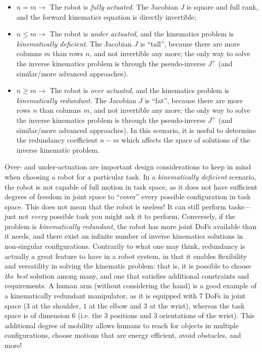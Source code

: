 \begin{itemize}
\item $n   =  m \rightarrow$ The robot is \textsl{fully actuated}. The Jacobian $J$ is square and full rank, and the forward kinematics equation is directly invertible;
\item $n \leq m \rightarrow$ The robot is \textsl{under actuated}, and the kinematics problem is \textsl{kinematically deficient}. The Jacobian $J$ is ``tall'', because there are more columns $m$ than rows $n$, and not invertible any more; the only way to solve the inverse kinematics problem is through the pseudo-inverse $J^+$ (and similar/more advanced approaches).
\item $n \geq m \rightarrow$ The robot is \textsl{over actuated}, and the kinematics problem is \textsl{kinematically redundant}. The Jacobian $J$ is ``fat'', because there are more rows $n$ than columns $m$, and not invertible any more; the only way to solve the inverse kinematics problem is through the pseudo-inverse $J^+$ (and similar/more advanced approaches). In this scenario, it is useful to determine the redundancy coefficient $n-m$ which affects the space of solutions of the inverse kinematic problem.
\end{itemize}

Over- and under-actuation are important design considerations to keep in mind when choosing a robot for a particular task.
In a \textsl{kinematically deficient} scenario, the robot is not capable of full motion in task space, as it does not have sufficient degrees of freedom in joint space to ``cover'' every possible configuration in task space. This does not mean that the robot is useless! It can still perform tasks---just not \textsl{every} possible task you might ask it to perform.
Conversely, if the problem is \textsl{kinematically redundant}, the robot has more joint DoFs available than it needs, and there exist an infinite number of inverse kinematics solutions in non-singular configurations.
Contrarily to what one may think, redundancy is actually a great feature to have in a robot system, in that it enables flexibility and versatility in solving the kinematic problem: that is, it is possible to choose \textsl{the best} solution among many, and one that satisfies additional constraints and requirements.
A human arm (without considering the hand) is a good example of a kinematically redundant manipulator, as it is equipped with $7$ DoFs in joint space ($3$ at the shoulder, $1$ at the elbow and $3$ at the wrist), whereas the task space is of dimension $6$ (i.e. the $3$ positions and $3$ orientations of the wrist).
This additional degree of mobility allows humans to reach for objects in multiple configurations, choose motions that are energy efficient, avoid obstacles, and more!
